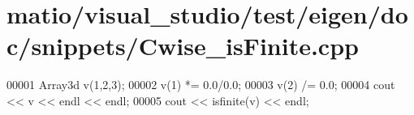 \hypertarget{matio_2visual__studio_2test_2eigen_2doc_2snippets_2_cwise__is_finite_8cpp_source}{}\section{matio/visual\+\_\+studio/test/eigen/doc/snippets/\+Cwise\+\_\+is\+Finite.cpp}
\label{matio_2visual__studio_2test_2eigen_2doc_2snippets_2_cwise__is_finite_8cpp_source}

\begin{DoxyCode}
00001 Array3d v(1,2,3);
00002 v(1) *= 0.0/0.0;
00003 v(2) /= 0.0;
00004 cout << v << endl << endl;
00005 cout << isfinite(v) << endl;
\end{DoxyCode}

